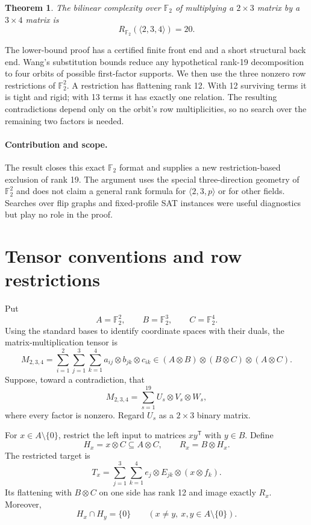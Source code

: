 \documentclass[10pt]{article}
\newtheorem{theorem}{Theorem}
\theoremstyle{remark}
\newcommand{\F}{\mathbb F}
\begin{document}
\begin{theorem}\label{thm:main}
The bilinear complexity over $\F_2$ of multiplying a $2\times3$ matrix by a
$3\times4$ matrix is
\[
 R_{\F_2}(\langle2,3,4\rangle)=20.
\]
\end{theorem}

The lower-bound proof has a certified finite front end and a short structural
back end.  Wang's substitution bounds reduce any hypothetical rank-19
decomposition to four orbits of possible first-factor supports.  We then use
the three nonzero row restrictions of $\F_2^2$.  A restriction has flattening
rank 12.  With 12 surviving terms it is tight and rigid; with 13 terms it has
exactly one relation.  The resulting contradictions depend only on the orbit's
row multiplicities, so no search over the remaining two factors is needed.

\paragraph{Contribution and scope.}
The result closes this exact $\F_2$ format and supplies a new restriction-based
exclusion of rank 19.  The argument uses the special three-direction geometry
of $\F_2^2$ and does not claim a general rank formula for
$\langle2,3,p\rangle$ or for other fields.  Searches over flip graphs and
fixed-profile SAT instances were useful diagnostics but play no role in the
proof.

\section{Tensor conventions and row restrictions}

Put
\[
 A=\F_2^2,\qquad B=\F_2^3,\qquad C=\F_2^4.
\]
Using the standard bases to identify coordinate spaces with their duals, the
matrix-multiplication tensor is
\begin{equation}\label{eq:tensor}
 M_{2,3,4}
 =\sum_{i=1}^{2}\sum_{j=1}^{3}\sum_{k=1}^{4}
   a_{ij}\otimes b_{jk}\otimes c_{ik}
 \in (A\otimes B)\otimes(B\otimes C)\otimes(A\otimes C).
\end{equation}
Suppose, toward a contradiction, that
\begin{equation}\label{eq:rank19}
 M_{2,3,4}=\sum_{s=1}^{19}U_s\otimes V_s\otimes W_s,
\end{equation}
where every factor is nonzero.  Regard $U_s$ as a $2\times3$ binary matrix.

For $x\in A\setminus\{0\}$, restrict the left input to matrices $xy^{\mathsf
T}$ with $y\in B$.  Define
\[
 H_x=x\otimes C\subseteq A\otimes C,
 \qquad R_x=B\otimes H_x.
\]
The restricted target is
\begin{equation}\label{eq:restricted}
 T_x=\sum_{j=1}^{3}\sum_{k=1}^{4}
 e_j\otimes E_{jk}\otimes(x\otimes f_k).
\end{equation}
Its flattening with $B\otimes C$ on one side has rank 12 and image exactly
$R_x$.  Moreover,
\begin{equation}\label{eq:intersection}
 H_x\cap H_y=\{0\}\qquad(x\neq y,
 \ x,y\in A\setminus\{0\}).
\end{equation}
\end{document}
